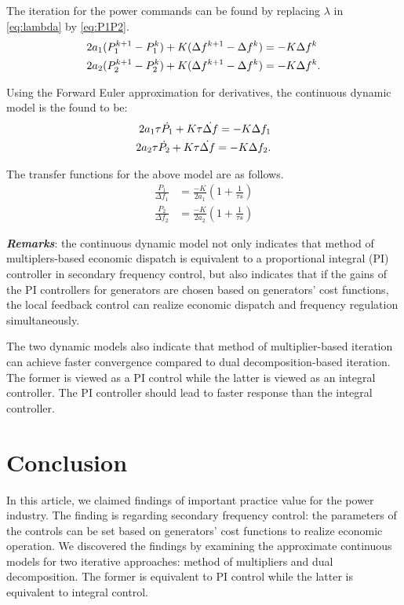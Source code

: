 \documentclass[10pt, journal, final, twocolumns]{IEEEtran}
\begin{document}
The iteration for the power commands can be found by replacing $\lambda$ in \eqref{eq:lambda} by \eqref{eq:P1P2}.
\begin{align}
2a_1(P^{k+1}_1-P^{k}_1) +K(\Delta f^{k+1} -\Delta f^k) &= -K\Delta f^k \notag\\
2a_2(P^{k+1}_2-P^{k}_2) +K(\Delta f^{k+1} -\Delta f^k) &= -K\Delta f^k.
\end{align}

Using the Forward Euler approximation for derivatives, the continuous dynamic model is the found to be:
\begin{align}
2a_1 \tau \dot{P_1} + K\tau \dot{\Delta f} =  -K\Delta f_1 \notag\\
2a_2 \tau \dot{P_2} + K\tau \dot{\Delta f} =  -K\Delta f_2.
\end{align}

The transfer functions for the above model are as follows.
\begin{align}
\frac{P_1}{\Delta f_1}&  = \frac{-K}{2a_1}\left(1+\frac{1}{\tau s}\right) \\
\frac{P_2}{\Delta f_2}&  = \frac{-K}{2a_2}\left(1+\frac{1}{\tau s}\right)
\end{align}

\emph{\textbf{Remarks}}: the continuous dynamic model not only indicates that method of multiplers-based economic dispatch is equivalent to a proportional integral (PI) controller in secondary frequency control, but also indicates that if the gains of the PI controllers for generators are chosen based on generators' cost functions, the local feedback control can realize economic dispatch and frequency regulation simultaneously.

The two dynamic models also indicate that method of multiplier-based iteration can achieve faster convergence compared to dual decomposition-based iteration. The former is viewed as a PI control while the latter is viewed as an integral controller. The PI controller should lead to faster response than the integral controller.





\section{Conclusion}
In this article, we claimed findings of important practice value for the power industry. The finding is regarding secondary frequency control: the parameters of the controls can be set based on generators' cost functions to realize economic operation.
We discovered the findings by examining the approximate continuous models for two iterative approaches: method of multipliers and dual decomposition. The former is equivalent to PI control while the latter is equivalent to integral control.
\end{document}

